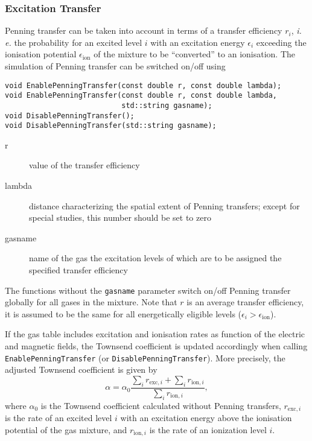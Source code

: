 \subsubsection{Excitation Transfer}

Penning transfer can be taken into account in terms of a transfer efficiency 
\(r_{i}\), \textit{i.\,e.} the probability for an excited level \(i\) with an  
excitation energy \(\epsilon_{i}\) exceeding the ionisation potential 
\(\epsilon_{\text{ion}}\) of the mixture to 
be ``converted'' to an ionisation.
The simulation of Penning transfer can be switched on/off using
\begin{lstlisting}
void EnablePenningTransfer(const double r, const double lambda);
void EnablePenningTransfer(const double r, const double lambda, 
                           std::string gasname);
void DisablePenningTransfer();
void DisablePenningTransfer(std::string gasname);
\end{lstlisting}
\begin{description}
  \item[r] value of the transfer efficiency
  \item[lambda] distance characterizing the spatial extent of Penning transfers; 
                except for special studies, this number should be set to zero
  \item[gasname] name of the gas the excitation levels of which are to be assigned 
                 the specified transfer efficiency 
\end{description}
The functions without the \texttt{gasname} parameter
switch on/off Penning transfer globally for all gases in the mixture. 
Note that \(r\) is an average transfer efficiency, it is assumed to be the same 
for all energetically eligible levels (\(\epsilon_{i} > \epsilon_{\text{ion}}\)).

If the gas table includes excitation and ionisation rates as function 
of the electric and magnetic fields, the Townsend coefficient is updated 
accordingly when calling \texttt{EnablePenningTransfer} 
(or \texttt{DisablePenningTransfer}). More precisely,  
the adjusted Townsend coefficient is given by
\begin{equation*}
  \alpha = \alpha_{0} \frac{\sum_{i} r_{\text{exc}, i} + \sum_{i} r_{\text{ion}, i}}{\sum_{i} r_{\text{ion}, i}},
\end{equation*}
where $\alpha_{0}$ is the Townsend coefficient calculated without Penning 
transfers,
$r_{\text{exc}, i}$ is the rate of an excited level $i$ with an excitation 
energy above the ionisation potential of the gas mixture, and 
$r_{\text{ion}, i}$ is the rate of an ionization level $i$.

